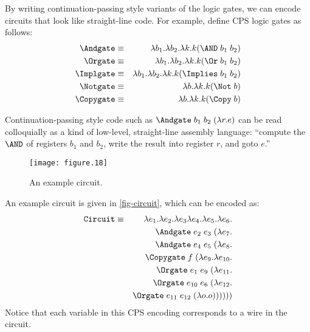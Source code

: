 By writing continuation-passing style variants of the logic gates, we
can encode circuits that look like straight-line code.  For example,
define CPS logic gates as follows:
\begin{eqnarray*}
  \Andgate  & \equiv & \lambda b_1.\lambda b_2.\lambda k.k(\AND\;b_1\;b_2)\\
  \Orgate   & \equiv & \lambda b_1.\lambda b_2.\lambda k.k(\Or\;b_1\;b_2)\\
  \Implgate & \equiv & \lambda b_1.\lambda b_2.\lambda k.k(\Implies\;b_1\;b_2)\\
  \Notgate  & \equiv & \lambda b.\lambda k. k(\Not\;b)\\
  \Copygate & \equiv & \lambda b.\lambda k.k(\Copy\;b)
\end{eqnarray*}

Continuation-passing style code such as $\Andgate\;b_1\;b_2\;(\lambda
r. e)$ can be read colloquially as a kind of low-level, straight-line
assembly language: ``compute the $\AND$ of registers $b_1$ and $b_2$,
write the result into register $r$, and goto $e$.''

\begin{figure} 
  \centering 
  \texttt{[image: figure.18]}
  \caption{An example circuit.}
  \label{fig-circuit}
\end{figure}

An example circuit is given in \autoref{fig-circuit}, which can be
encoded as:
\begin{eqnarray*}
\mbox{\tt Circuit} & \equiv & 
\lambda e_1.\lambda e_2.\lambda e_3\lambda e_4.\lambda e_5.\lambda e_6.\\
& & \Andgate\; e_2\; e_3\; (\lambda e_7.\\
& & \Andgate\; e_4\; e_5\; (\lambda e_8.\\
& & \Copygate\; f\; (\lambda e_9.\lambda e_{10}.\\
& & \Orgate\; e_1\; e_9\; (\lambda e_{11}.\\
& & \Orgate\; e_{10}\; e_6\; (\lambda e_{12}.\\
& & \Orgate\; e_{11}\; e_{12}\; (\lambda o.o))))))
\end{eqnarray*}
Notice that each variable in this CPS encoding corresponds to a wire
in the circuit.

